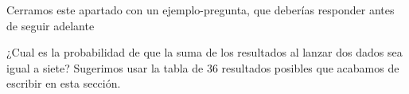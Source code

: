 \begin{itemize}
        Cerramos este apartado con un ejemplo-pregunta, que deberías responder antes de seguir adelante
        \begin{Ejemplo}\label{Sesion08:ejem:CualEsProbabilidadSumaDosDadosIgualASiete}
        ¿Cual es la probabilidad de que la suma de los resultados al lanzar dos dados sea igual a siete? Sugerimos usar la tabla de 36 resultados posibles que acabamos de escribir en esta sección.
        \end{Ejemplo}

\end{itemize}


%




%
%
%
%


